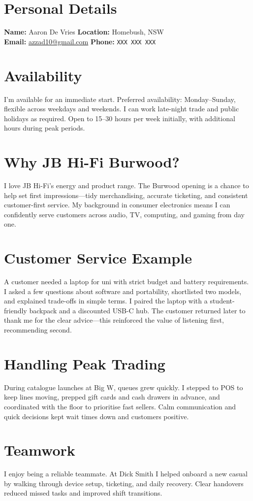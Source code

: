 \documentclass[a4paper,10pt]{article}
\begin{document}
\section*{Personal Details}
\textbf{Name:} Aaron De Vries \hfill \textbf{Location:} Homebush, NSW\\
\textbf{Email:} \href{mailto:azzad10@gmail.com}{azzad10@gmail.com} \hfill \textbf{Phone:} \texttt{XXX XXX XXX}
\section*{Availability}
I'm available for an immediate start. Preferred availability: Monday–Sunday, flexible across weekdays and weekends. I can work late-night trade and public holidays as required. Open to 15–30 hours per week initially, with additional hours during peak periods.
\section*{Why JB Hi-Fi Burwood?}
I love JB Hi-Fi's energy and product range. The Burwood opening is a chance to help set first impressions—tidy merchandising, accurate ticketing, and consistent customer-first service. My background in consumer electronics means I can confidently serve customers across audio, TV, computing, and gaming from day one.
\section*{Customer Service Example}
A customer needed a laptop for uni with strict budget and battery requirements. I asked a few questions about software and portability, shortlisted two models, and explained trade-offs in simple terms. I paired the laptop with a student-friendly backpack and a discounted USB-C hub. The customer returned later to thank me for the clear advice—this reinforced the value of listening first, recommending second.
\section*{Handling Peak Trading}
During catalogue launches at Big W, queues grew quickly. I stepped to POS to keep lines moving, prepped gift cards and cash drawers in advance, and coordinated with the floor to prioritise fast sellers. Calm communication and quick decisions kept wait times down and customers positive.
\section*{Teamwork}
I enjoy being a reliable teammate. At Dick Smith I helped onboard a new casual by walking through device setup, ticketing, and daily recovery. Clear handovers reduced missed tasks and improved shift transitions.
\end{document}
